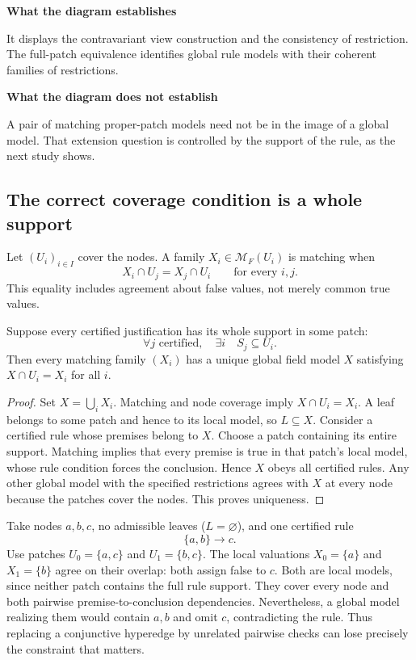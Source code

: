 {\sffamily\bfseries\color{KomorebiTeal}What the diagram establishes}\par\smallskip
It displays the contravariant view construction and the consistency of restriction. The full-patch equivalence identifies global rule models with their coherent families of restrictions.

\medskip
{\sffamily\bfseries\color{KomorebiGold}What the diagram does not establish}\par\smallskip
A pair of matching proper-patch models need not be in the image of a global model. That extension question is controlled by the support of the rule, as the next study shows.

\subsection{The correct coverage condition is a whole support}

Let $(U_i)_{i\in I}$ cover the nodes. A family $X_i\in\mathcal M_F(U_i)$ is matching when
\[
X_i\cap U_j=X_j\cap U_i\qquad\text{for every }i,j.
\]
This equality includes agreement about false values, not merely common true values.

\begin{PPTtheorem}
\label{PPT:res:24:3}
\label{PPT:thm:support-gluing}
Suppose every certified justification has its whole support in some patch:
\[
\forall j\text{ certified},\quad\exists i\quad S_j\subseteq U_i.
\]
Then every matching family $(X_i)$ has a unique global field model $X$ satisfying $X\cap U_i=X_i$ for all $i$.
\end{PPTtheorem}
\begin{proof}
Set $X=\bigcup_iX_i$. Matching and node coverage imply $X\cap U_i=X_i$. A leaf belongs to some patch and hence to its local model, so $L\subseteq X$. Consider a certified rule whose premises belong to $X$. Choose a patch containing its entire support. Matching implies that every premise is true in that patch's local model, whose rule condition forces the conclusion. Hence $X$ obeys all certified rules. Any other global model with the specified restrictions agrees with $X$ at every node because the patches cover the nodes. This proves uniqueness.
\end{proof}

\begin{PPTexample}
\label{PPT:res:24:4}
Take nodes $a,b,c$, no admissible leaves ($L=\varnothing$), and one certified rule
\[
\{a,b\}\longrightarrow c.
\]
Use patches $U_0=\{a,c\}$ and $U_1=\{b,c\}$. The local valuations $X_0=\{a\}$ and $X_1=\{b\}$ agree on their overlap: both assign false to $c$. Both are local models, since neither patch contains the full rule support. They cover every node and both pairwise premise-to-conclusion dependencies. Nevertheless, a global model realizing them would contain $a,b$ and omit $c$, contradicting the rule. Thus replacing a conjunctive hyperedge by unrelated pairwise checks can lose precisely the constraint that matters.
\end{PPTexample}

